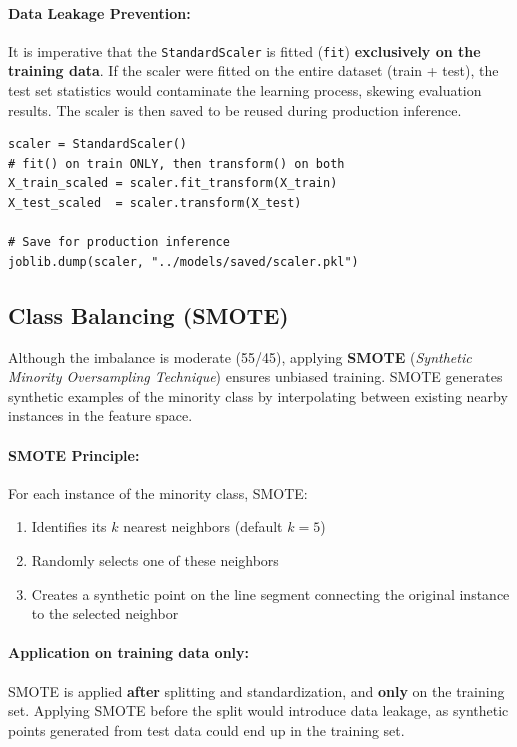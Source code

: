 \paragraph{Data Leakage Prevention:} It is imperative that the \texttt{StandardScaler} is fitted (\texttt{fit}) \textbf{exclusively on the training data}. If the scaler were fitted on the entire dataset (train + test), the test set statistics would contaminate the learning process, skewing evaluation results. The scaler is then saved to be reused during production inference.

\begin{lstlisting}[caption={Standardization with data leakage prevention}]
scaler = StandardScaler()
# fit() on train ONLY, then transform() on both
X_train_scaled = scaler.fit_transform(X_train)
X_test_scaled  = scaler.transform(X_test)

# Save for production inference
joblib.dump(scaler, "../models/saved/scaler.pkl")
\end{lstlisting}

\subsection{Class Balancing (SMOTE)}
\label{sec:smote}

Although the imbalance is moderate (55/45), applying \textbf{SMOTE} (\textit{Synthetic Minority Oversampling Technique}) ensures unbiased training. SMOTE generates synthetic examples of the minority class by interpolating between existing nearby instances in the feature space.

\paragraph{SMOTE Principle:} For each instance of the minority class, SMOTE:
\begin{enumerate}
    \item Identifies its $k$ nearest neighbors (default $k=5$)
    \item Randomly selects one of these neighbors
    \item Creates a synthetic point on the line segment connecting the original instance to the selected neighbor
\end{enumerate}

\paragraph{Application on training data only:} SMOTE is applied \textbf{after} splitting and standardization, and \textbf{only} on the training set. Applying SMOTE before the split would introduce data leakage, as synthetic points generated from test data could end up in the training set.

